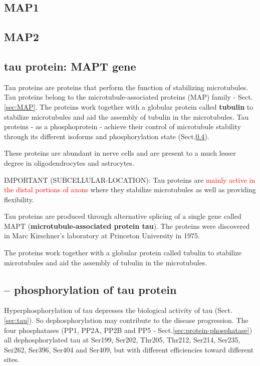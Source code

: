 \subsection{MAP1}
\label{sec:MAP1}

\subsection{MAP2}
\label{sec:MAP2} 




\subsection{tau protein: MAPT gene}
\label{sec:tau-protein}
\label{sec:MAPT-gene}
\label{sec:tau}

Tau proteins are proteins that perform the function of stabilizing microtubules.
Tau proteins belong to the microtubule-associated proteins (MAP) family -
Sect.\ref{sec:MAP}. The proteins work together with a globular protein called
{\bf tubulin} to stabilize microtubules and aid the assembly of tubulin in the
microtubules. Tau proteins - as a phosphoprotein - achieve their control of
microtubule stability through its different isoforms and phosphorylation state
(Sect.\ref{sec:tau-phosphorylation}).

These proteins are abundant in nerve cells and are present to a much lesser
degree in oligodendrocytes and astrocytes.

IMPORTANT (SUBCELLULAR-LOCATION): Tau proteins are \textcolor{red}{mainly active
in the distal portions of axons} where they stabilize microtubules as well as
providing flexibility.

Tau proteins are produced through alternative splicing of a single gene called
MAPT ({\bf microtubule-associated protein tau}). The proteins were discovered in
Marc Kirschner's laboratory at Princeton University in 1975.

The proteins work together with a globular protein called tubulin to stabilize
microtubules and aid the assembly of tubulin in the microtubules. 

\subsection{-- phosphorylation of tau protein}
\label{sec:tau-phosphorylation}

Hyperphosphorylation of tau depresses the biological activity of tau
(Sect.\ref{sec:tau}). So dephosphorylation may contribute to the disease
progression.  The four phosphatases (PP1, PP2A, PP2B and PP5 -
Sect.\ref{sec:protein-phosphatase}) all dephosphorylated tau at Ser199, Ser202,
Thr205, Thr212, Ser214, Ser235, Ser262, Ser396, Ser404 and Ser409, but with
different efficiencies toward different sites.


